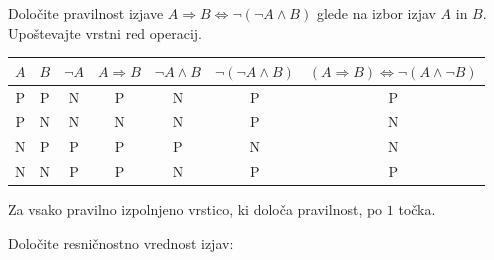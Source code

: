 \documentclass[addpoints]{exam}
\begin{document}
\begin{questions}

    
    \question[4]
    Določite pravilnost izjave $ A\Rightarrow  B\Leftrightarrow \lnot(\lnot A\land B)$ glede na izbor izjav $A$ in $B$. Upoštevajte vrstni red operacij.

    \begin{solution}[10cm]
        \begin{table}[H]
            \begin{tabular}{ccccccc}
             $A$ & $B$ & $\lnot A$ & $A\Rightarrow B$ & $\lnot A\land B$ & $\lnot(\lnot A\land B)$ & $(A\Rightarrow  B)\Leftrightarrow \lnot(A\land \lnot B)$\\ \hline
             P & P & N & P & N & P & P \\ 
             P & N & N & N & N & P & N \\
             N & P & P & P & P & N & N \\
             N & N & P & P & N & P & P
            \end{tabular}
        \end{table}
        Za vsako pravilno izpolnjeno vrstico, ki določa pravilnost, po $1$ točka.

    \end{solution}




    \question[2]
    Določite resničnostno vrednost izjav:


\end{questions}
\end{document}
